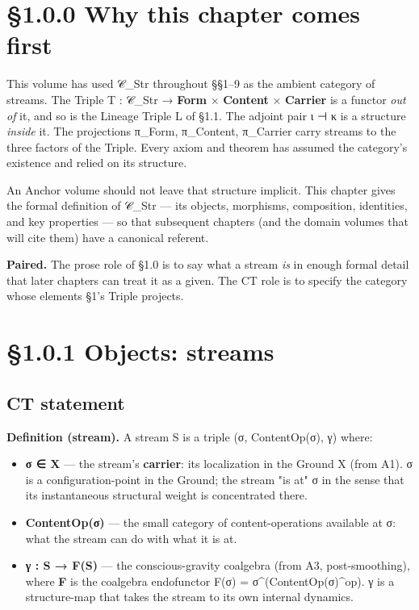 \documentclass[11pt, openany]{book}
\newcommand{\sectionbreak}{\clearpage}
\begin{document}
\sectionbreak

\section{§1.0.0 Why this chapter comes first}

This volume has used 𝒞\_\allowbreak{}Str throughout §§1–9 as the ambient category of streams. The Triple T : 𝒞\_\allowbreak{}Str → \textbf{Form} × \textbf{Content} × \textbf{Carrier} is a functor \textit{out of} it, and so is the Lineage Triple L of §1.1. The adjoint pair ι ⊣ κ is a structure \textit{inside} it. The projections π\_\allowbreak{}Form, π\_\allowbreak{}Content, π\_\allowbreak{}Carrier carry streams to the three factors of the Triple. Every axiom and theorem has assumed the category's existence and relied on its structure.

An Anchor volume should not leave that structure implicit. This chapter gives the formal definition of 𝒞\_\allowbreak{}Str --- its objects, morphisms, composition, identities, and key properties --- so that subsequent chapters (and the domain volumes that will cite them) have a canonical referent.

\textbf{Paired.} The prose role of §1.0 is to say what a stream \textit{is} in enough formal detail that later chapters can treat it as a given. The CT role is to specify the category whose elements §1's Triple projects.

\sectionbreak

\section{§1.0.1 Objects: streams}

\subsection{CT statement}

\textbf{Definition (stream).} A stream S is a triple (σ, ContentOp(σ), γ) where:

\begin{itemize}
\item \textbf{σ ∈ X} --- the stream's \textbf{carrier}: its localization in the Ground X (from A1). σ is a configuration-point in the Ground; the stream "is at" σ in the sense that its instantaneous structural weight is concentrated there.
\item \textbf{ContentOp(σ)} --- the small category of content-operations available at σ: what the stream can do with what it is at.
\item \textbf{γ : S → F(S)} --- the conscious-gravity coalgebra (from A3, post-smoothing), where \textbf{F} is the coalgebra endofunctor F(σ) = σ\textasciicircum{}(ContentOp(σ)\textasciicircum{}op). γ is a structure-map that takes the stream to its own internal dynamics.
\end{itemize}
\end{document}
